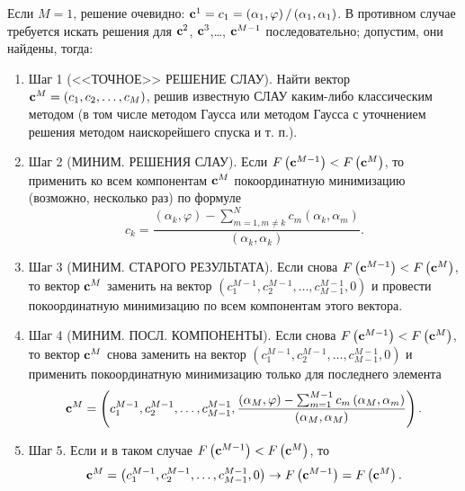 \documentclass[a4paper]{article}
\begin{document}
Если $M=1$, решение очевидно: ${\bf c}^1=c_1=\left({\alpha }_1,\varphi \right)/\left({\alpha }_1,{\alpha }_1\right)$. В противном случае требуется искать решения для ${\bf c}^2$, ${\bf c}^3$,{\dots}, ${\bf c}^{M-1}$ последовательно; допустим, они найдены, тогда:
\begin{enumerate}
 \item  Шаг 1 (<<ТОЧНОЕ>> РЕШЕНИЕ СЛАУ).
Найти вектор ${\bf c}^M=\left(c_1,c_2,\dots ,c_M\right)$, решив известную СЛАУ каким-либо классическим методом (в том числе методом Гаусса или методом Гаусса с уточнением решения методом наискорейшего спуска и т. п.).

\item  Шаг 2 (МИНИМ. РЕШЕНИЯ СЛАУ). Если $F\left({\bf c}^{M-1}\right)<F\left({\bf c}^M\right)$, то применить ко всем компонентам ${\bf c}^M$ покоординатную минимизацию (возможно, несколько раз) по формуле
\begin{equation}
  c_k=\frac{\left({\alpha }_k,\varphi \right)-\sum^N_{m=1,m\neq k}{c_m}\left({\alpha }_k,{\alpha }_m\right)}{\left({\alpha }_k,{\alpha }_k\right)}.
\end{equation}

\item   Шаг 3 (МИНИМ. СТАРОГО РЕЗУЛЬТАТА). Если снова $F\left({\bf c}^{M-1}\right)<F\left({\bf c}^M\right)$, то вектор ${\bf c}^M$ заменить на вектор $\left(c^{M-1}_1,c^{M-1}_2,\dots ,c^{M-1}_{M-1},0\right)$ и провести покоординатную минимизацию по всем компонентам этого вектора.

\item  Шаг 4 (МИНИМ. ПОСЛ. КОМПОНЕНТЫ). Если снова $F\left({\bf c}^{M-1}\right)<F\left({\bf c}^M\right)$, то вектор ${\bf c}^M$ снова заменить на вектор $\left(c^{M-1}_1,c^{M-1}_2,\dots ,c^{M-1}_{M-1},0\right)$ и применить покоординатную минимизацию только для последнего элемента
\begin{equation}{\bf c}^M=\left(c^{M-1}_1,c^{M-1}_2,\dots ,c^{M-1}_{M-1},\frac{\left({\alpha }_M,\varphi \right)-\sum^{M-1}_{m=1}{c_m}\left({\alpha }_M,{\alpha }_m\right)}{\left({\alpha }_M,{\alpha }_M\right)}\right).\end{equation} 

\item  Шаг 5. Если и в таком случае $F\left({\bf c}^{M-1}\right)<F\left({\bf c}^M\right)$, то 
\begin{equation}{\bf c}^M=\left(c^{M-1}_1,c^{M-1}_2,\dots ,c^{M-1}_{M-1},0\right)\to F\left({\bf c}^{M-1}\right)=F\left({\bf c}^M\right).\end{equation} 

\end{enumerate}
\end{document}
